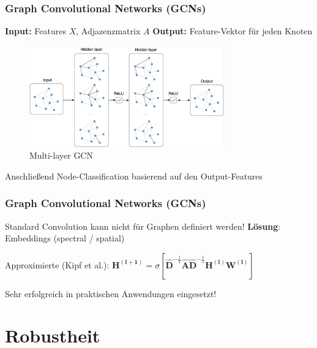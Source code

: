 \documentclass{beamer}
\begin{document}
\begin{frame}
  \frametitle{Graph Convolutional Networks (GCNs)}

  \textbf{Input:} Features $X$, Adjazenzmatrix $A$\newline
  \textbf{Output:} Feature-Vektor für jeden Knoten
  \begin{figure}
    \centering
    \includegraphics[width=0.75\textwidth]{img/GCN.png}
    \caption*{Multi-layer GCN \cite{Kipf_2016}}
  \end{figure}
  Anschließend Node-Classification basierend auf den Output-Features
\end{frame}

\begin{frame}
  \frametitle{Graph Convolutional Networks (GCNs)}

  Standard Convolution kann nicht für Graphen definiert werden!\newline
  \textbf{Lösung}: Embeddings (spectral / spatial)\newline

  Approximierte  (Kipf et al.):\newline
  $\boldsymbol{H^{(l+1)}} = \sigma [\boldsymbol{\hat{D}}^{- \frac{1}{2}} \boldsymbol{\hat{A}} \boldsymbol{\hat{D}}^{- \frac{1}{2}} \boldsymbol{H^{(l)}} \boldsymbol{W^{(l)}}]$\newline

  Sehr erfolgreich in praktischen Anwendungen eingesetzt!
\end{frame}

\section{Robustheit}
\end{document}
